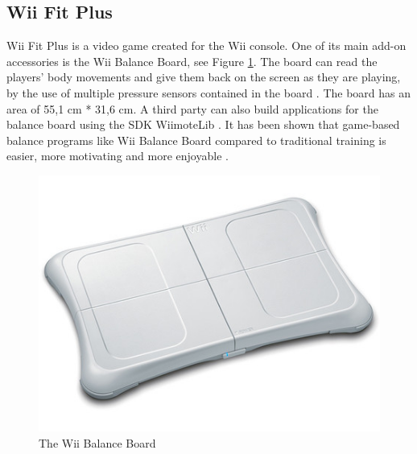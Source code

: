 \subsection{Wii Fit Plus}
Wii Fit Plus is a video game created for the Wii console. One of its main add-on accessories is the Wii Balance Board, see Figure \ref{fig:WiiBalanceBoard}. The board can read the players' body movements and give them back on the screen as they are playing, by the use of multiple pressure sensors contained in the board \cite{whatiswiifit}. The board has an area of 55,1 cm {*} 31,6 cm. A third party can also build applications for the balance board using the SDK WiimoteLib \cite{comparison}. It has been shown that game-based balance programs like Wii Balance Board compared to traditional training is easier, more motivating and more enjoyable \cite{taylor2011activity}.
\begin{figure}[h!]
\begin{center}
\includegraphics[scale=0.4]{wiibalance}
\caption[Wii Balance Board]{The Wii Balance Board}
\label{fig:WiiBalanceBoard}
\end{center}
\end{figure}

